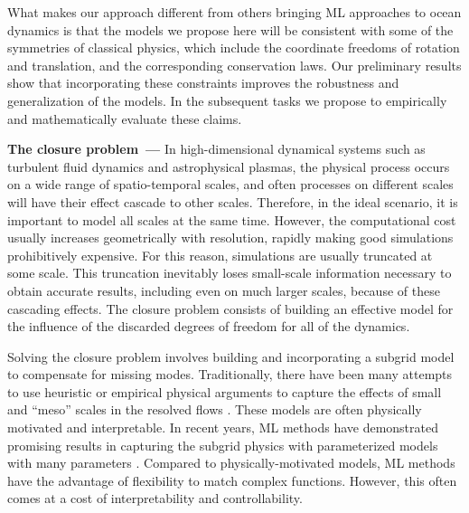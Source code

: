 \documentclass[11pt]{article}
\renewcommand{\paragraph}[1]{\medskip\par\noindent\textbf{#1~---}}
\begin{document}
What makes our approach different from others bringing ML approaches to ocean dynamics is that the models we propose here will be consistent with some of the symmetries of classical physics, which include the coordinate freedoms of rotation and translation, and the corresponding conservation laws.
Our preliminary results show that incorporating these constraints improves the robustness and generalization of the models. In the subsequent tasks we propose to empirically and mathematically evaluate these claims.

\paragraph{The closure problem}
In high-dimensional dynamical systems such as turbulent fluid dynamics and astrophysical plasmas, the physical process occurs on a wide range of spatio-temporal scales, and often processes on different scales will have their effect cascade to other scales. 
Therefore, in the ideal scenario, it is important to model all scales at the same time.
However, the computational cost usually increases geometrically with resolution, rapidly making good simulations prohibitively expensive.
For this reason, simulations are usually truncated at some scale.
This truncation inevitably loses small-scale information necessary to obtain accurate results, including even on much larger scales, because of these cascading effects.
The closure problem consists of building an effective model for the influence of the discarded degrees of freedom for all of the dynamics.

Solving the closure problem involves building and incorporating a subgrid model to compensate for missing modes.
Traditionally, there have been many attempts to use heuristic or empirical physical arguments to capture the effects of small and ``meso'' scales in the resolved flows \cite{thuburn2014cascades,jansen2014parameterizing, mana2014toward, zanna2017scale, bachman2017scale, pearson2017evaluation, bachman2018relationship, jansen2019toward, bachman2019gm, grooms2015numerical, berloff2018dynamically, juricke2020ocean}.
These models are often physically motivated and interpretable.
In recent years, ML methods have demonstrated promising results in capturing the subgrid physics with parameterized models with many parameters \cite{rasp2018deep, Bolton2019,maulik2019subgrid, beck2019deep, yuval2020stable, guan2022stable, beucler2021climate, shamekh2022implicit, wang2022non}.
Compared to physically-motivated models, ML methods have the advantage of flexibility to match complex functions.
However, this often comes at a cost of interpretability and controllability.
\end{document}

